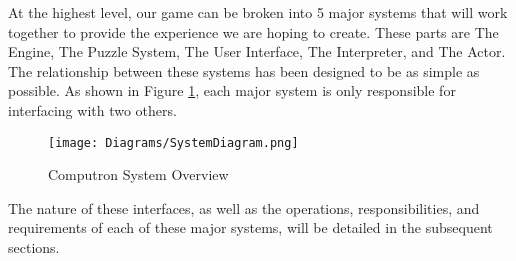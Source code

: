 At the highest level, our game can be broken into 5 major systems that will work 
together to provide the experience we are hoping to create. These parts are The 
Engine, The Puzzle System, The User Interface, The Interpreter, and The Actor. 
The relationship between these systems has been designed to be as simple as 
possible. As shown in Figure \ref{fig:overall_system_diagram}, each major system 
is only responsible for interfacing with two others. 

\begin{figure}[!hb]
    \caption{Computron System Overview}
    \label{fig:overall_system_diagram}
    \centering
    \texttt{[image: Diagrams/SystemDiagram.png]}
\end{figure}

The nature of these interfaces, as well as the operations, responsibilities, and 
requirements of each of these major systems, will be detailed in the subsequent sections.